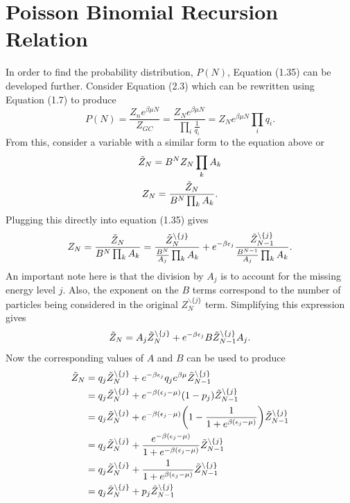 \section{Poisson Binomial Recursion Relation}
In order to find the probability distribution, $P(N)$, Equation (1.35) can be developed further. Consider Equation (2.3) which can be rewritten using Equation (1.7) to produce
\begin{equation}
    P(N)=\frac{Z_n e^{\beta\mu N}}{Z_{GC}}=\frac{Z_N e^{\beta\mu N}}{\prod_i \frac{1}{q_i}}= Z_N e^{\beta\mu N} \prod_i q_i.
\end{equation}
From this, consider a variable with a similar form to the equation above or 
\begin{gather}
    \Tilde{Z}_N = B^N Z_N \prod_k A_k\\
    Z_N=\frac{\Tilde{Z}_N}{B^N \prod_k A_k}.
\end{gather}
Plugging this directly into equation (1.35) gives 
\begin{equation}
    Z_N=\frac{\Tilde{Z}_N}{B^N \prod_k A_k} = \frac{\Tilde{Z}_N^{\backslash\{j\}}}{\frac{B^N}{A_j} \prod_k A_k}+e^{-\beta\epsilon_j}\frac{\Tilde{Z}_{N-1}^{\backslash\{j\}}}{\frac{B^{N-1}}{A_j} \prod_k A_k}.
\end{equation}
An important note here is that the division by $A_j$ is to account for the missing energy level $j$. Also, the exponent on the $B$ terms correspond to the number of particles being considered in the original $Z_N^{\backslash\{j\}}$ term. Simplifying this expression gives
\begin{equation}
   \Tilde{Z}_N=A_j \Tilde{Z}_N^{\backslash\{j\}}+ e^{-\beta\epsilon_j} B \Tilde{Z}_{N-1}^{\backslash\{j\}} A_j.
\end{equation}
Now the corresponding values of $A$ and $B$ can be used to produce
\begin{align}
    \Tilde{Z}_N&=q_j \Tilde{Z}_N^{\backslash\{j\}}+ e^{-\beta\epsilon_j} q_j e^{\beta\mu} \Tilde{Z}_{N-1}^{\backslash\{j\}}\nonumber\\
    &=q_j \Tilde{Z}_N^{\backslash\{j\}}+ e^{-\beta(\epsilon_j-\mu)} (1-p_j) \Tilde{Z}_{N-1}^{\backslash\{j\}}\nonumber\\
    &=q_j \Tilde{Z}_N^{\backslash\{j\}}+ e^{-\beta(\epsilon_j-\mu)} \qty(1-\frac{1}{1+e^{\beta(\epsilon_j-\mu)}}) \Tilde{Z}_{N-1}^{\backslash\{j\}}\nonumber\\
    &=q_j \Tilde{Z}_N^{\backslash\{j\}}+ \frac{e^{-\beta(\epsilon_j-\mu)}}{1+e^{-\beta(\epsilon_j-\mu)}} \Tilde{Z}_{N-1}^{\backslash\{j\}}\nonumber\\
    &=q_j \Tilde{Z}_N^{\backslash\{j\}}+ \frac{1}{1+e^{\beta(\epsilon_j-\mu)}} \Tilde{Z}_{N-1}^{\backslash\{j\}}\nonumber\\
    &=q_j \Tilde{Z}_N^{\backslash\{j\}}+ p_j \Tilde{Z}_{N-1}^{\backslash\{j\}}
\end{align}
